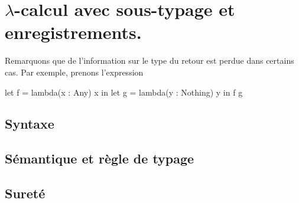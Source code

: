 \chapter{$\lambda$-calcul avec sous-typage et enregistrements.}

Remarquons que de l'information sur le type du retour est perdue dans certains
cas. Par exemple, prenons l'expression

let f = lambda(x : Any) x in
let g = lambda(y : Nothing) y in
f g

\section{Syntaxe}

\section{Sémantique et règle de typage}

\section{Sureté}
